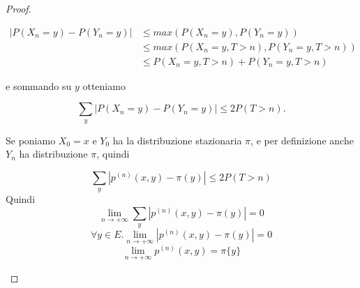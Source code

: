 \documentclass{article}
\newtheorem{definition}{Definizione}[section]
\begin{document}
\begin{proof}
\begin{enumerate}
    \[
        \begin{split}   
        |P(X_n = y) - P(Y_n = y)| 
            & \leq max( P(X_n = y), P(Y_n = y)) \\
            & \leq max( P(X_n = y, T > n), P(Y_n = y, T > n)) \\
            & \leq P(X_n = y, T > n) + P(Y_n = y, T > n)
        \end{split}
    \]

    e sommando su $y$ otteniamo

    $$\sum_{y} |P(X_n = y) - P(Y_n = y)| \leq 2P(T > n).$$

    Se poniamo $X_0 = x$ e $Y_0$ ha la distribuzione stazionaria $\pi$, e per definizione anche $Y_n$ ha distribuzione $\pi$, quindi

    $$\sum_{y} |p^{(n)}(x, y) - \pi(y)| \leq 2P(T > n) $$
    Quindi
     \[
        \lim_{n \to +\infty} \sum_{y} |p^{(n)}(x, y) - \pi(y)| = 0
    \]
    \[ \forall y \in E. 
        \lim_{n \to +\infty} |p^{(n)}(x, y) - \pi(y)| = 0
    \]
    \[
        \lim_{n \to +\infty} p^{(n)}(x,y) = \pi\{y\} 
    \]

\end{enumerate}
\end{proof}


\end{document}
